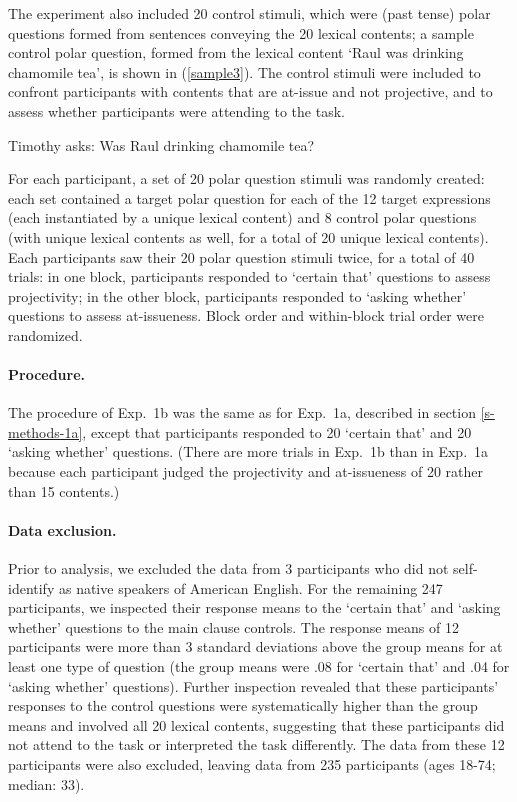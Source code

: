 \documentclass[11pt,fleqn]{article}
\newcommand{\6}{\mbox{$[\hspace*{-.6mm}[$}}
\newcommand{\9}{\mbox{$]\hspace*{-.6mm}]$}}
\begin{document}
The experiment also included 20 control stimuli, which were (past tense) polar questions formed from sentences conveying the 20 lexical contents; a sample control polar question, formed from the lexical content `Raul was drinking chamomile tea', is shown in (\ref{sample3}). The control stimuli were included to confront participants with contents that are at-issue and not projective, and to assess whether participants were attending to the task.

\begin{exe}
\ex\label{sample3} Timothy asks: Was Raul drinking chamomile tea?
\end{exe}

For each participant, a set of 20 polar question stimuli was randomly created: each set contained a target polar question for each of the 12 target expressions (each instantiated by a unique lexical content) and 8 control polar questions (with unique lexical contents as well, for a total of 20 unique lexical contents). Each participants saw their 20 polar question stimuli twice, for a total of 40 trials: in one block, participants responded to `certain that' questions to assess projectivity; in the other block, participants responded to `asking whether' questions to assess at-issueness. Block order and within-block trial order were randomized.

\paragraph{Procedure.} The procedure of Exp.~1b was the same as for Exp.~1a, described in section \ref{s-methods-1a}, except that participants responded to 20 `certain that' and 20 `asking whether' questions. (There are more trials in Exp.~1b than in Exp.~1a because each participant judged the projectivity and at-issueness of 20  rather than 15 contents.)


\paragraph{Data exclusion.} Prior to analysis, we excluded the data from 3 participants who did not self-identify as native speakers of American English. For the remaining 247 participants, we inspected their response means to the `certain that' and `asking whether' questions to the main clause controls. The response means of 12 participants were more than 3 standard deviations above the group means for at least one type of question (the group means were .08 for `certain that' and .04 for `asking whether' questions). Further inspection revealed that these participants' responses to the control questions were systematically higher than the group means and involved all 20 lexical contents, suggesting that these participants did not attend to the task or interpreted the task differently. The data from these 12 participants were also excluded, leaving data from 235 participants (ages 18-74; median: 33).
\end{document}
